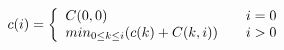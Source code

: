 
\[c(i) = 
\left\{
\begin{array}{l l l}
C(0,0) &  & i = 0\\
min_{0 \leq k \leq i}(c(k) + C(k, i)) &  & i > 0\\
\end{array}
\right.
\]

